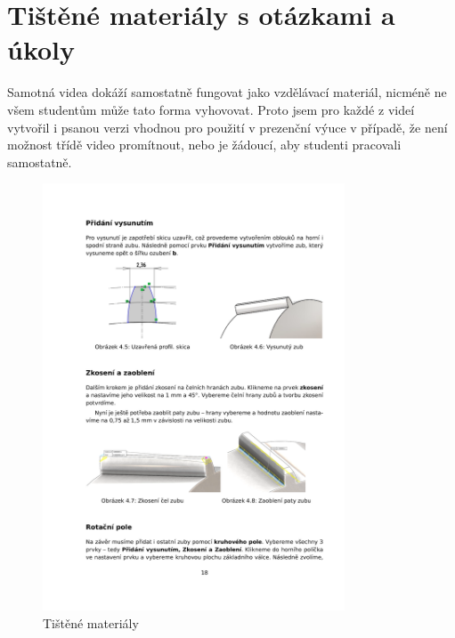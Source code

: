 \section{Tištěné materiály s otázkami a úkoly}
Samotná videa dokáží samostatně fungovat jako vzdělávací materiál, nicméně ne všem studentům může tato forma vyhovovat.
Proto jsem pro každé z videí vytvořil i psanou verzi vhodnou pro použití v prezenční výuce v případě, že není možnost třídě video promítnout, nebo je žádoucí, aby studenti pracovali samostatně.
\begin{figure}[htbp]
    \centering
    \begin{minipage}[b]{0.45\textwidth}
        \centering
        \includegraphics[width=0.8\textwidth]{img/020/guide1.png}
        \caption{Tištěné materiály}
        \label{fig:thumb3}
    \end{minipage}
    \qquad
    \begin{minipage}[b]{0.45\textwidth}
        \centering

\end{minipage}
\end{figure}
